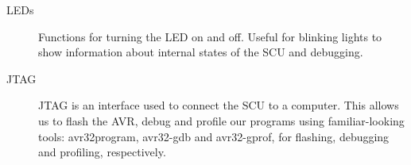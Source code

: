 \begin{description}
\item[LEDs] Functions for turning the LED on and off. Useful for blinking
  lights to show information about internal states of the SCU and debugging.
  
\item[JTAG] JTAG is an interface used to connect the SCU to a
  computer. This allows us to flash the AVR, debug and profile our programs
  using familiar-looking tools: avr32program, avr32-gdb and avr32-gprof, for
  flashing, debugging and profiling, respectively.
\end{description}
